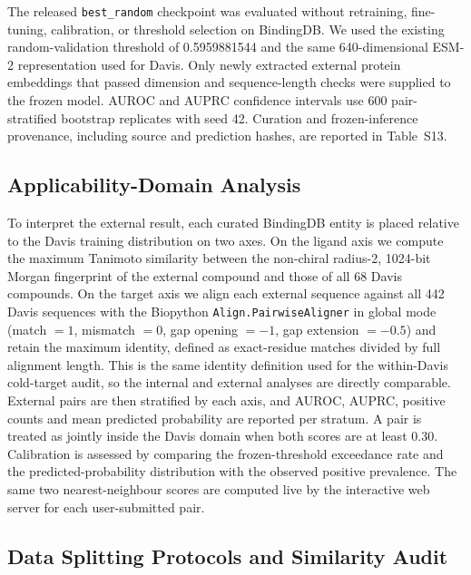 \documentclass[fleqn,10pt]{wlscirep}
\begin{document}
The released \texttt{best\_random} checkpoint was evaluated without retraining,
fine-tuning, calibration, or threshold selection on BindingDB.  We used the
existing random-validation threshold of 0.5959881544 and the same
640-dimensional ESM-2 representation used for Davis. Only newly extracted
external protein embeddings that passed dimension and sequence-length checks
were supplied to the frozen model.
AUROC and AUPRC confidence intervals use 600 pair-stratified bootstrap
replicates with seed 42.  Curation and frozen-inference provenance, including
source and prediction hashes, are reported in Table~S13.

\subsection{Applicability-Domain Analysis}
\label{sec:ad_methods}

To interpret the external result, each curated BindingDB entity is placed
relative to the Davis training distribution on two axes.  On the ligand axis we
compute the maximum Tanimoto similarity between the non-chiral radius-2,
1024-bit Morgan fingerprint of the external compound and those of all 68 Davis
compounds.  On the target axis we align each external sequence against all 442
Davis sequences with the Biopython \texttt{Align.PairwiseAligner} in global mode
(match $=1$, mismatch $=0$, gap opening $=-1$, gap extension $=-0.5$) and retain
the maximum identity, defined as exact-residue matches divided by full alignment
length.  This is the same identity definition used for the within-Davis
cold-target audit, so the internal and external analyses are directly
comparable.  External pairs are then stratified by each axis, and AUROC, AUPRC,
positive counts and mean predicted probability are reported per stratum.  A pair
is treated as jointly inside the Davis domain when both scores are at least
0.30.  Calibration is assessed by comparing the frozen-threshold exceedance rate
and the predicted-probability distribution with the observed positive
prevalence.  The same two nearest-neighbour scores are computed live by the
interactive web server for each user-submitted pair.

\subsection{Data Splitting Protocols and Similarity Audit}
\end{document}

